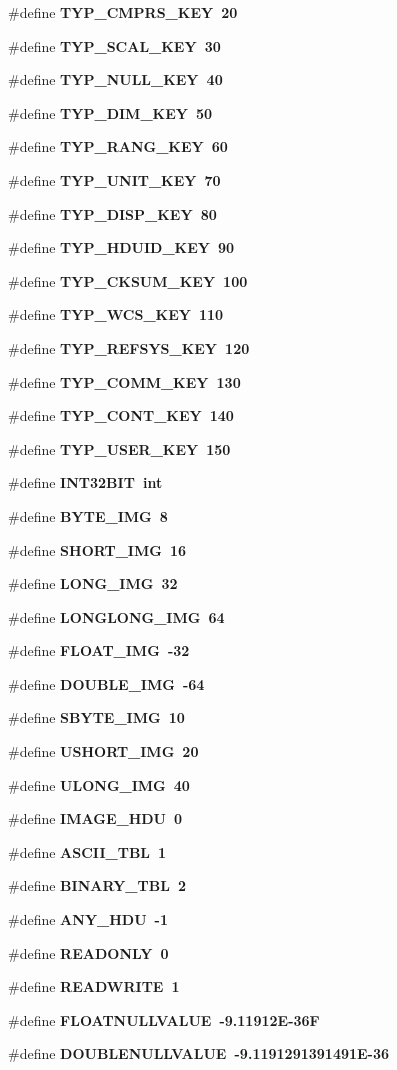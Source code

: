 \begin{CompactItemize}
\item 
\#define \bf{TYP\_\-CMPRS\_\-KEY}~20
\item 
\#define \bf{TYP\_\-SCAL\_\-KEY}~30
\item 
\#define \bf{TYP\_\-NULL\_\-KEY}~40
\item 
\#define \bf{TYP\_\-DIM\_\-KEY}~50
\item 
\#define \bf{TYP\_\-RANG\_\-KEY}~60
\item 
\#define \bf{TYP\_\-UNIT\_\-KEY}~70
\item 
\#define \bf{TYP\_\-DISP\_\-KEY}~80
\item 
\#define \bf{TYP\_\-HDUID\_\-KEY}~90
\item 
\#define \bf{TYP\_\-CKSUM\_\-KEY}~100
\item 
\#define \bf{TYP\_\-WCS\_\-KEY}~110
\item 
\#define \bf{TYP\_\-REFSYS\_\-KEY}~120
\item 
\#define \bf{TYP\_\-COMM\_\-KEY}~130
\item 
\#define \bf{TYP\_\-CONT\_\-KEY}~140
\item 
\#define \bf{TYP\_\-USER\_\-KEY}~150
\item 
\#define \bf{INT32BIT}~int
\item 
\#define \bf{BYTE\_\-IMG}~8
\item 
\#define \bf{SHORT\_\-IMG}~16
\item 
\#define \bf{LONG\_\-IMG}~32
\item 
\#define \bf{LONGLONG\_\-IMG}~64
\item 
\#define \bf{FLOAT\_\-IMG}~-32
\item 
\#define \bf{DOUBLE\_\-IMG}~-64
\item 
\#define \bf{SBYTE\_\-IMG}~10
\item 
\#define \bf{USHORT\_\-IMG}~20
\item 
\#define \bf{ULONG\_\-IMG}~40
\item 
\#define \bf{IMAGE\_\-HDU}~0
\item 
\#define \bf{ASCII\_\-TBL}~1
\item 
\#define \bf{BINARY\_\-TBL}~2
\item 
\#define \bf{ANY\_\-HDU}~-1
\item 
\#define \bf{READONLY}~0
\item 
\#define \bf{READWRITE}~1
\item 
\#define \bf{FLOATNULLVALUE}~-9.11912E-36F
\item 
\#define \bf{DOUBLENULLVALUE}~-9.1191291391491E-36
\item 

\end{CompactItemize}
